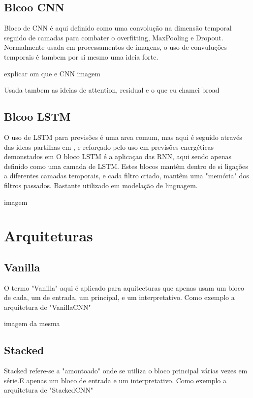 \subsection{Blcoo CNN}

Bloco de CNN é aqui definido como uma convolução na dimensão temporal seguido de camadas para combater o overfitting, MaxPooling e Dropout.
Normalmente usada em processamentos de imagens, o uso de convuluções temporais é tambem por si mesmo uma ideia forte.

explicar om que e CNN
imagem

Usada tambem as ideias de attention, residual e o que eu chamei broad


\subsection{Blcoo LSTM}

O uso de LSTM para previsões é uma area comum, mas aqui é seguido através das ideas partilhas em \cite{Hewamalage2021}, e reforçado pelo uso em previsões energéticas demonstados em \cite{Costa2022}
O bloco LSTM é a aplicaçao das RNN, aqui sendo apenas definido como uma camada de LSTM.
Estes blocos mantêm dentro de si ligações a diferentes camadas temporais, e cada filtro criado, mantêm uma "memória" dos filtros passados.
Bastante utilizado em modelação de linguagem.

imagem


\section{Arquiteturas  \label{se:dados_tratamento}}

\subsection{Vanilla \label{se:dados_tratamento}}

O termo "Vanilla" aqui é aplicado para aquitecturas que apenas usam um bloco de cada, um de entrada, um principal, e um interpretativo.
Como exemplo a arquitetura de "VanillaCNN"

imagem da mesma

\subsection{Stacked \label{se:dados_tratamento}}

Stacked refere-se a "amontoado" onde se utiliza o bloco principal várias vezes em série.E apenas um bloco de  entrada e um interpretativo.
Como exemplo a arquitetura de "StackedCNN"

